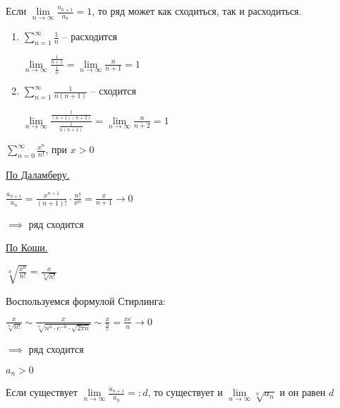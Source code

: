 \begin{remark}\slashns
	
	Если $\lim\limits_{n \to \infty} \frac{a_{n+1}}{a_n} = 1$, то ряд может как сходиться, так и расходиться.

	\begin{enumerate}

		\item $\sum\limits_{n = 1}^{\infty} \frac1n$ -- расходится

		$\lim\limits_{n \to \infty} \frac{\frac 1{n+1}}{\frac 1n} = \lim\limits_{n \to \infty} \frac n{n+1} = 1$

		\item $\sum\limits_{n = 1}^{\infty} \frac1{n(n+1)}$ -- сходится
	
		$\lim\limits_{n \to \infty} \frac{\frac 1{(n+1)(n+2)}}{\frac 1{n(n+1)}} = \lim\limits_{n \to \infty} \frac n{n+2} = 1$
	\end{enumerate}
\end{remark}

\begin{example}\slashns
	
	$\sum\limits_{n = 0}^{\infty} \frac{x^n}{n!}$, при $x > 0$
	
	\underline{По Даламберу.}

	 $\frac{a_{n+1}}{a_n} = \frac{x^{n+1}}{(n+1)!} \cdot \frac{n!}{x^n} = \frac{x}{n+1} \to 0$
	
	$\implies $ ряд сходится
	
	\underline {По Коши.}
	
	$\sqrt[n]{\frac{x^n}{n!}} = \frac{x}{\sqrt[n]{n!}}$ 

	Воспользуемся формулой Стирлинга:

	$ \frac{x}{\sqrt[n]{n!}} \sim \frac{x}{\sqrt[n]{n^n\cdot e^{-n} \cdot \sqrt{2\pi n}}}\sim \frac x {\frac ne} = \frac{xe}{n} \to 0$

	$\implies $ ряд сходится
\end{example}

\begin{theorem}\slashns
	
	$a_n > 0$
	
	Если существует $\lim\limits_{n \to \infty} \frac{a_{n+1}}{a_n} =: d$, то существует и $\lim\limits_{n \to \infty} \sqrt[n]{a_n}$ и он равен $d$
\end{theorem}


